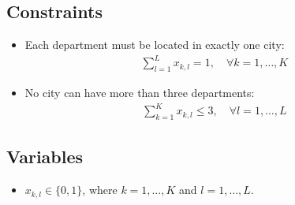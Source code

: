 \documentclass{article}
\begin{document}
\subsection*{Constraints}
\begin{itemize}
    \item Each department must be located in exactly one city:
    \begin{align*}
    \sum_{l=1}^{L} x_{k, l} = 1, \quad \forall k = 1, \ldots, K
    \end{align*}

    \item No city can have more than three departments:
    \begin{align*}
    \sum_{k=1}^{K} x_{k, l} \leq 3, \quad \forall l = 1, \ldots, L
    \end{align*}
\end{itemize}

\subsection*{Variables}
\begin{itemize}
    \item $x_{k, l} \in \{0, 1\}$, where $k = 1, \ldots, K$ and $l = 1, \ldots, L$.
\end{itemize}
\end{document}
